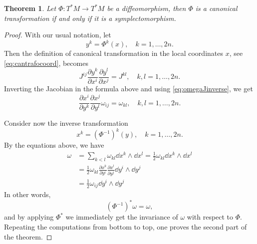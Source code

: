 \documentclass[english,fontsize=11pt,paper=b5]{scrbook}
\newtheorem{theorem}{Theorem}[chapter]
\theoremstyle{definition}
\begin{document}
    \begin{theorem}\label{thm:ctiffs}
      Let $\Phi: T^*M \to T^*M$ be a diffeomorphism, then $\Phi$ is a canonical transformation if and only if it is a symplectomorphism.
    \end{theorem}
    \begin{proof}
      With our usual notation, let
      \begin{equation}
        y^k = \Phi^k(x),\quad k=1,\ldots,2n.
      \end{equation}
      Then the definition of canonical transformation in the local coordinates $x$, see \eqref{eq:cantrafocoord}, becomes
      \begin{equation}
        J^{ij}\frac{\partial y^k}{\partial x^i}\frac{\partial y^l}{\partial x^j} = J^{kl},
        \quad k,l = 1,\ldots,2n.
      \end{equation}
      Inverting the Jacobian in the formula above and using \eqref{eq:omegaJinverse}, we get
      \begin{equation}
        \frac{\partial x^i}{\partial y^k}\frac{\partial x^j}{\partial y^l} \omega_{ij}= \omega_{kl},
        \quad k,l = 1,\ldots,2n.
      \end{equation}

      Consider now the inverse transformation
      \begin{equation}
        x^k = \left(\Phi^{-1}\right)^k(y),\quad k=1,\ldots,2n.
      \end{equation}
      By the equations above, we have
      \begin{align}
        \omega
     & = \sum_{k<l} \omega_{kl}\dd x^k \wedge \dd x^l
     = \frac12 \omega_{kl} \dd x^k \wedge \dd x^l                                                                       \\
     & = \frac12 \omega_{kl} \frac{\partial x^k}{\partial y^i}\frac{\partial x^l}{\partial y^j} \dd y^i \wedge \dd y^j \\
     & = \frac12 \omega_{ij} \dd y^i \wedge \dd y^j
      \end{align}
      In other words,
      \begin{equation}
        \left(\Phi^{-1}\right)^* \omega = \omega,
      \end{equation}
      and by applying $\Phi^*$ we immediately get the invariance of $\omega$ with respect to $\Phi$.
      Repeating the computations from bottom to top, one proves the second part of the theorem.
    \end{proof}
\end{document}
